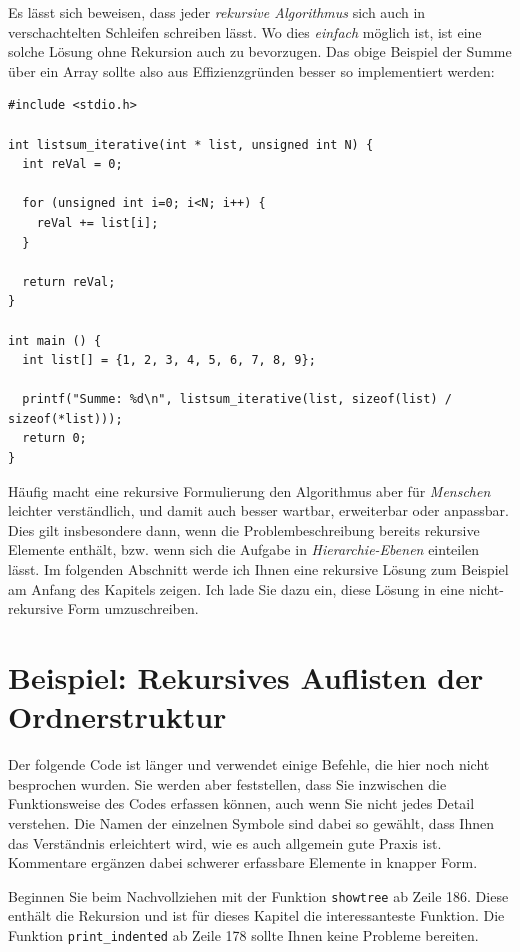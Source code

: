 Es lässt sich beweisen, dass jeder \emph{rekursive Algorithmus} sich auch in verschachtelten Schleifen schreiben lässt. Wo dies \emph{einfach} möglich ist, ist eine solche Lösung ohne Rekursion auch zu bevorzugen. Das obige Beispiel der Summe über ein Array sollte also aus Effizienzgründen besser so implementiert werden:

\begin{codebox}
\begin{verbatim}
#include <stdio.h>

int listsum_iterative(int * list, unsigned int N) {
  int reVal = 0;
  
  for (unsigned int i=0; i<N; i++) {
    reVal += list[i];
  }
  
  return reVal;
}

int main () {
  int list[] = {1, 2, 3, 4, 5, 6, 7, 8, 9};
  
  printf("Summe: %d\n", listsum_iterative(list, sizeof(list) / sizeof(*list)));
  return 0;
}
\end{verbatim}
\end{codebox}

Häufig macht eine rekursive Formulierung den Algorithmus aber für \emph{Menschen} leichter verständlich, und damit auch besser wartbar, erweiterbar oder anpassbar. Dies gilt insbesondere dann, wenn die Problembeschreibung bereits rekursive Elemente enthält, bzw. wenn sich die Aufgabe in \emph{Hierarchie-Ebenen} einteilen lässt. Im folgenden Abschnitt werde ich Ihnen eine rekursive Lösung zum Beispiel am Anfang des Kapitels zeigen. Ich lade Sie dazu ein, diese Lösung in eine nicht-rekursive Form umzuschreiben.

\section{Beispiel: Rekursives Auflisten der Ordnerstruktur}
Der folgende Code ist länger und verwendet einige Befehle, die hier noch nicht besprochen wurden. Sie werden aber feststellen, dass Sie inzwischen die Funktionsweise des Codes erfassen können, auch wenn Sie nicht jedes Detail verstehen. Die Namen der einzelnen Symbole sind dabei so gewählt, dass Ihnen das Verständnis erleichtert wird, wie es auch allgemein gute Praxis ist. Kommentare ergänzen dabei schwerer erfassbare Elemente in knapper Form.

Beginnen Sie beim Nachvollziehen mit der Funktion \texttt{showtree} ab Zeile 186. Diese enthält die Rekursion und ist für dieses Kapitel die interessanteste Funktion. Die Funktion \texttt{print\_indented} ab Zeile 178 sollte Ihnen keine Probleme bereiten.

